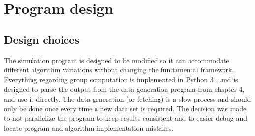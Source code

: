 \section{Program design}
\subsection{Design choices}
The simulation program is designed to be modified so it can accommodate different algorithm variations without changing the fundamental framework.
Everything regarding group computation is implemented in Python 3 \cite{Python3}, and is designed to parse the output from the data generation program from chapter 4, and use it directly.
The data generation (or fetching) is a slow process and should only be done once every time a new data set is required.
The decision was made to not parallelize the program to keep results consistent and to easier debug and locate program and algorithm implementation mistakes. 


